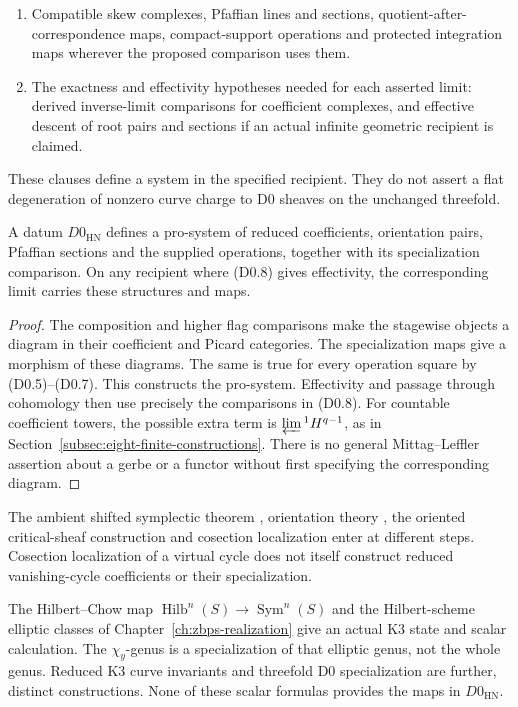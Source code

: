 \begin{definition}
\begin{enumerate}
maps and higher flag coherences.
\item[\textup{(D0.7)}] Compatible skew complexes, Pfaffian lines
and sections, quotient-after-correspondence maps, compact-support
operations and protected integration maps wherever the proposed
comparison uses them.
\item[\textup{(D0.8)}] The exactness and effectivity hypotheses
needed for each asserted limit: derived inverse-limit comparisons
for coefficient complexes, and effective descent of root pairs and
sections if an actual infinite geometric recipient is claimed.
\end{enumerate}
These clauses define a system in the specified recipient. They do
not assert a flat degeneration of nonzero curve charge to D0
sheaves on the unchanged threefold.
\end{definition}

\begin{theorem}
\label{thm:G-D0}
A datum \(D0_{\mathrm{HN}}\) defines a pro-system of reduced
coefficients, orientation pairs, Pfaffian sections and the supplied
operations, together with its specialization comparison. On any
recipient where \textup{(D0.8)} gives effectivity, the corresponding
limit carries these structures and maps.
\end{theorem}
\begin{proof}
The composition and higher flag comparisons make the stagewise
objects a diagram in their coefficient and Picard categories.
The specialization maps give a morphism of these diagrams.
The same is true for every operation square by
\textup{(D0.5)}--\textup{(D0.7)}. This constructs the pro-system.
Effectivity and passage through cohomology then use precisely the
comparisons in \textup{(D0.8)}. For countable coefficient towers,
the possible extra term is \(\varprojlim{}^1H^{q-1}\), as in
Section~\ref{subsec:eight-finite-constructions}. There is no general
Mittag--Leffler assertion about a gerbe or a functor without first
specifying the corresponding diagram.
\end{proof}

The ambient shifted symplectic theorem \cite{PTVV2013}, orientation
theory \cite{JoyceUpmeier,JoyceTanakaUpmeier}, the oriented
critical-sheaf construction \cite{BBDJS2015} and cosection
localization \cite{KiemLi2013} enter at different steps.
Cosection localization of a virtual cycle does not itself construct
reduced vanishing-cycle coefficients or their specialization.

\begin{remark}
\label{rem:G-D0-elliptic-genus}
The Hilbert--Chow map
\(\operatorname{Hilb}^n(S)\to\operatorname{Sym}^n(S)\) and the
Hilbert-scheme elliptic classes of
Chapter~\ref{ch:zbps-realization} give an actual K3 state and
scalar calculation. The \(\chi_y\)-genus is a specialization of
that elliptic genus, not the whole genus. Reduced K3 curve
invariants \cite{MaulikPandharipande} and threefold D0
specialization are further, distinct constructions. None of these
scalar formulas provides the maps in \(D0_{\mathrm{HN}}\).
\end{remark}

